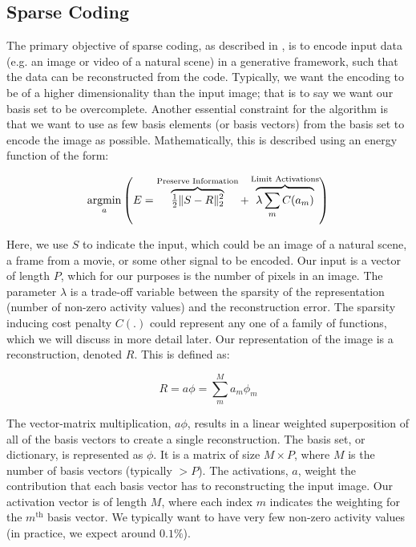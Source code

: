 \documentclass[smallextended]{svjour3}       %
\newcommand{\argmin}{\operatornamewithlimits{argmin}}
\begin{document}
\subsection{Sparse Coding} \label{sparsecoding}
\noindent The primary objective of sparse coding, as described in \cite{olshausen1997sparse}, is to encode input data (e.g. an image or video of a natural scene) in a generative framework, such that the data can be reconstructed from the code. Typically, we want the encoding to be of a higher dimensionality than the input image; that is to say we want our basis set to be overcomplete. Another essential constraint for the algorithm is that we want to use as few basis elements (or basis vectors) from the basis set to encode the image as possible. Mathematically, this is described using an energy function of the form:

\begin{equation}
    \argmin\limits_{a}
        \left( E = 
            \overbrace{ \tfrac{1}{2} \| S - R \|_{2}^{2} }^\text{Preserve Information} +
        \overbrace{ \lambda \sum\limits_{m}C(a_{m}) }^\text{Limit Activations} \right)
\label{energyfunc}
\end{equation}

\noindent Here, we use $S$ to indicate the input, which could be an image of a natural scene, a frame from a movie, or some other signal to be encoded. Our input is a vector of length $P$, which for our purposes is the number of pixels in an image. The parameter $\lambda$ is a trade-off variable between the sparsity of the representation (number of non-zero activity values) and the reconstruction error. The sparsity inducing cost penalty $C(.)$ could represent any one of a family of functions, which we will discuss in more detail later. Our representation of the image is a reconstruction, denoted $R$. This is defined as:

\begin{equation}
    R = a \phi = \sum\limits_{m}^{M} a_{m} \phi_{m}
\label{recon}
\end{equation}

\noindent The vector-matrix multiplication, $a \phi$, results in a linear weighted superposition of all of the basis vectors to create a single reconstruction. The basis set, or dictionary, is represented as $\phi$. It is a matrix of size $M \times P$, where $M$ is the number of basis vectors (typically $>P$). The activations, $a$, weight the contribution that each basis vector has to reconstructing the input image. Our activation vector is of length $M$, where each index $m$ indicates the weighting for the $m^\text{th}$ basis vector. We typically want to have very few non-zero activity values (in practice, we expect around $0.1\%$).\\
\end{document}
